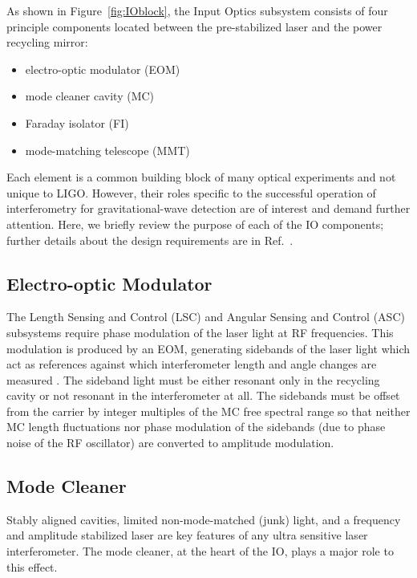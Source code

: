 As shown in Figure~\ref{fig:IOblock}, the Input Optics subsystem
consists of four principle components located between the
pre-stabilized laser and the power recycling mirror:
\begin{itemize}
\item electro-optic modulator (EOM) \vspace{-10 pt}
\item mode cleaner cavity (MC) \vspace{-10 pt}
\item Faraday isolator (FI) \vspace{-10 pt}
\item mode-matching telescope (MMT)
\end{itemize}
Each element is a common building block of many optical experiments
and not unique to LIGO. However, their roles specific to the
successful operation of interferometry for gravitational-wave
detection are of interest and demand further attention. Here, we
briefly review the purpose of each of the IO components;
further details about the design requirements are in
Ref.~\citep{Camp1997Input}.




\subsection{Electro-optic Modulator} 
The Length Sensing and Control (LSC) and Angular Sensing and Control
(ASC) subsystems require phase modulation of the laser light at RF
frequencies. This modulation is produced by an EOM, generating
sidebands of the laser light which act as references against which
interferometer length and angle changes are measured
\citep{Fritschel2001Readout}. The sideband light must be either
resonant only in the recycling cavity or not resonant in the
interferometer at all. The sidebands must be offset from the carrier
by integer multiples of the MC free spectral range so that
neither MC length fluctuations nor phase modulation of the sidebands
(due to phase noise of the RF oscillator) are converted to amplitude modulation.


\subsection{Mode Cleaner}
Stably aligned cavities, limited non-mode-matched (junk) light, and a
frequency and amplitude stabilized laser are key features of any ultra
sensitive laser interferometer. The mode cleaner, at the heart of the
IO, plays a major role to this effect.

